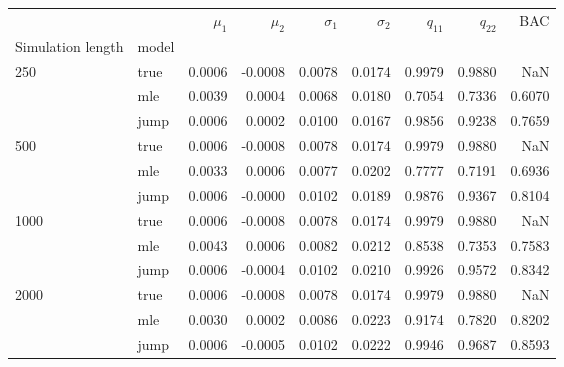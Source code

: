 \begin{tabular}{llrrrrrrr}
\toprule
     &      &  $\mu_1$ &  $\mu_2$ &  $\sigma_1$ &  $\sigma_2$ &  $q_{11}$ &  $q_{22}$ &     BAC \\
Simulation length & model &          &          &             &             &           &           &         \\
\midrule
250  & true &   0.0006 &  -0.0008 &      0.0078 &      0.0174 &    0.9979 &    0.9880 &     NaN \\
     & mle &   0.0039 &   0.0004 &      0.0068 &      0.0180 &    0.7054 &    0.7336 &  0.6070 \\
     & jump &   0.0006 &   0.0002 &      0.0100 &      0.0167 &    0.9856 &    0.9238 &  0.7659 \\
500  & true &   0.0006 &  -0.0008 &      0.0078 &      0.0174 &    0.9979 &    0.9880 &     NaN \\
     & mle &   0.0033 &   0.0006 &      0.0077 &      0.0202 &    0.7777 &    0.7191 &  0.6936 \\
     & jump &   0.0006 &  -0.0000 &      0.0102 &      0.0189 &    0.9876 &    0.9367 &  0.8104 \\
1000 & true &   0.0006 &  -0.0008 &      0.0078 &      0.0174 &    0.9979 &    0.9880 &     NaN \\
     & mle &   0.0043 &   0.0006 &      0.0082 &      0.0212 &    0.8538 &    0.7353 &  0.7583 \\
     & jump &   0.0006 &  -0.0004 &      0.0102 &      0.0210 &    0.9926 &    0.9572 &  0.8342 \\
2000 & true &   0.0006 &  -0.0008 &      0.0078 &      0.0174 &    0.9979 &    0.9880 &     NaN \\
     & mle &   0.0030 &   0.0002 &      0.0086 &      0.0223 &    0.9174 &    0.7820 &  0.8202 \\
     & jump &   0.0006 &  -0.0005 &      0.0102 &      0.0222 &    0.9946 &    0.9687 &  0.8593 \\
\bottomrule
\end{tabular}
